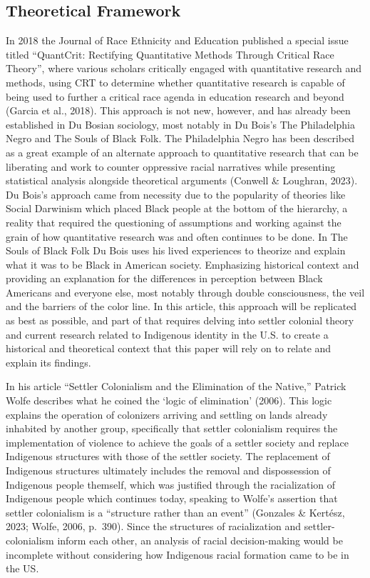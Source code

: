 \documentclass[
  12pt,
  letterpaper,
]{article}
\begin{document}
\subsection{Theoretical Framework}\label{theoretical-framework}

In 2018 the Journal of Race Ethnicity and Education published a special
issue titled ``QuantCrit: Rectifying Quantitative Methods Through
Critical Race Theory'', where various scholars critically engaged with
quantitative research and methods, using CRT to determine whether
quantitative research is capable of being used to further a critical
race agenda in education research and beyond (Garcia et al., 2018). This
approach is not new, however, and has already been established in Du
Bosian sociology, most notably in Du Bois's The Philadelphia Negro and
The Souls of Black Folk. The Philadelphia Negro has been described as a
great example of an alternate approach to quantitative research that can
be liberating and work to counter oppressive racial narratives while
presenting statistical analysis alongside theoretical arguments (Conwell
\& Loughran, 2023). Du Bois's approach came from necessity due to the
popularity of theories like Social Darwinism which placed Black people
at the bottom of the hierarchy, a reality that required the questioning
of assumptions and working against the grain of how quantitative
research was and often continues to be done. In The Souls of Black Folk
Du Bois uses his lived experiences to theorize and explain what it was
to be Black in American society. Emphasizing historical context and
providing an explanation for the differences in perception between Black
Americans and everyone else, most notably through double consciousness,
the veil and the barriers of the color line. In this article, this
approach will be replicated as best as possible, and part of that
requires delving into settler colonial theory and current research
related to Indigenous identity in the U.S. to create a historical and
theoretical context that this paper will rely on to relate and explain
its findings.

In his article ``Settler Colonialism and the Elimination of the
Native,'' Patrick Wolfe describes what he coined the `logic of
elimination' (2006). This logic explains the operation of colonizers
arriving and settling on lands already inhabited by another group,
specifically that settler colonialism requires the implementation of
violence to achieve the goals of a settler society and replace
Indigenous structures with those of the settler society. The replacement
of Indigenous structures ultimately includes the removal and
dispossession of Indigenous people themself, which was justified through
the racialization of Indigenous people which continues today, speaking
to Wolfe's assertion that settler colonialism is a ``structure rather
than an event'' (Gonzales \& Kertész, 2023; Wolfe, 2006, p.~390). Since
the structures of racialization and settler-colonialism inform each
other, an analysis of racial decision-making would be incomplete without
considering how Indigenous racial formation came to be in the US.
\end{document}

